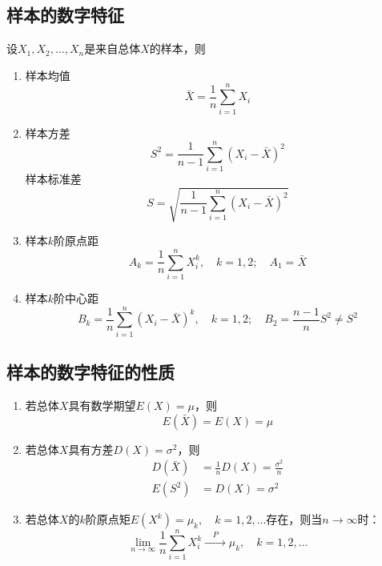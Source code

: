 \subsection{样本的数字特征}
设$X_1, X_2, \dots, X_n$是来自总体$X$的样本，则
\begin{enumerate}
	\item 样本均值
	\begin{equation}
		\bar X = \frac{1}{n}\sum_{i=1}^{n} X_i
	\end{equation}

	\item 样本方差
	\begin{equation}
		S^2 = \frac{1}{n-1}\sum_{i=1}^{n}(X_i - \bar X)^2
	\end{equation}
	样本标准差
	\begin{equation}
		S = \sqrt{\frac{1}{n-1}\sum_{i=1}^{n}(X_i - \bar X)^2}
	\end{equation}

	\item 样本$k$阶原点距
	\begin{equation}
		A_k = \frac{1}{n}\sum_{i=1}^{n}X_i^k, \quad k = 1, 2; \quad A_1 = \bar X
	\end{equation}

	\item 样本$k$阶中心距
	\begin{equation}
		B_k = \frac{1}{n}\sum_{i=1}^{n}(X_i - \bar X)^k, \quad k = 1, 2; \quad B_2 = \frac{n-1}{n}S^2 \neq S^2
	\end{equation}
\end{enumerate}

\subsection{样本的数字特征的性质}
\begin{enumerate}
	\item 若总体$X$具有数学期望$E(X)=\mu$，则
	\begin{equation}
		E(\bar X) = E(X) = \mu
	\end{equation}
	\item 若总体$X$具有方差$D(X)=\sigma^2$，则
	\begin{align}
		D(\bar X) &= \frac{1}{n}D(X) = \frac{\sigma^2}{n} \\
		E(S^2) &= D(X) = \sigma^2
	\end{align}
	\item 若总体$X$的$k$阶原点矩$E(X^k) = \mu_k, \quad k = 1, 2, \dots$存在，则当$n \to \infty$时：
	\begin{equation}
		\lim_{n\to \infty} \frac{1}{n}\sum_{i=1}^{n}X_i^k \xrightarrow{\quad P \quad} \mu_k, \quad k = 1, 2, \dots
	\end{equation}
\end{enumerate}

